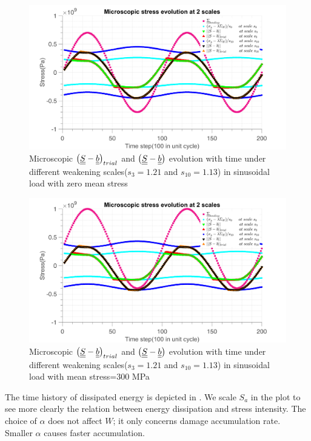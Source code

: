 \begin{figure}[!h]
\centering
\includegraphics[width=\textwidth]{figures//trialsin_0.png} 
\caption{Microscopic $\left(  \uline{\uline{S}}-\uline{\uline{b}}\right)_{trial}$ and $\left( \uline{\uline{S}}-\uline{\uline{b}}\right)$ evolution with time under different weakening scales($s_{3}=1.21$ and $s_{10}=1.13$) in sinusoidal load with zero mean stress}
\label{fig.trialsin0}
\end{figure}
\begin{figure}[!h]
\centering
\includegraphics[width=\textwidth]{figures//trialsin_m.png} 
\caption{Microscopic $\left(  \uline{\uline{S}}-\uline{\uline{b}}\right)_{trial}$ and $\left( \uline{\uline{S}}-\uline{\uline{b}}\right)$ evolution with time under different weakening scales($s_{3}=1.21$ and $s_{10}=1.13$) in sinusoidal load with mean stress=300 MPa}
\label{fig.trialsinm}
\end{figure}

The time history of dissipated energy is depicted in . We scale $S_{a}$ in the plot to see more clearly the relation between energy dissipation and stress intensity. The choice of $\alpha$ does not affect $W$; it only concerns damage accumulation rate. Smaller $\alpha$ causes faster accumulation.

